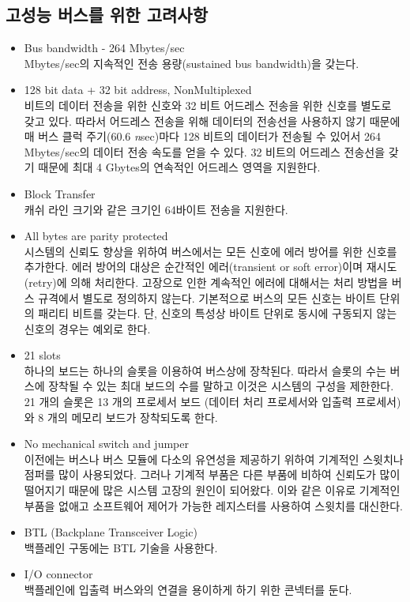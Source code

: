 \subsection{고성능 버스를 위한 고려사항}
\begin{itemize}
	\item Bus bandwidth - 264 Mbytes/sec \\
		 Mbytes/sec의 지속적인 전송 용량(sustained
		bus bandwidth)을 갖는다.
	\item 128 bit data + 32 bit address, NonMultiplexed \\
		 비트의 데이터 전송을 위한 신호와
		32 비트 어드레스 전송을 위한 신호를 
		별도로 갖고 있다. 따라서 어드레스 전송을 위해 데이터의 전송선을
		사용하지 않기 때문에
		매 버스 클럭 주기(60.6 {\it n\/}sec)마다 128 비트의 데이터가
		전송될 수 있어서 264 Mbytes/sec의 
		데이터 전송 속도를 얻을 수 있다.
		32 비트의 어드레스 전송선을 갖기 때문에
		최대 4 Gbytes의 연속적인 어드레스 영역을 지원한다.
	\item Block Transfer \\
		캐쉬 라인 크기와 같은 크기인 64바이트 전송을 지원한다.
	\item All bytes are parity protected \\
		시스템의 신뢰도 향상을 위하여 버스에서는 모든 신호에
		에러 방어를 위한 신호를 추가한다.
		에러 방어의 대상은 순간적인 에러(transient or soft error)이며
		재시도(retry)에 의해 처리한다.
		고장으로 인한 계속적인 에러에 대해서는 처리 방법을 버스 규격에서
		별도로 정의하지 않는다.
		기본적으로 버스의 모든 신호는 바이트 단위의 패리티 비트를 갖는다.
		단, 신호의 특성상 바이트 단위로 동시에 구동되지 않는
		신호의 경우는 예외로 한다.
	\item 21 slots \\
		하나의 보드는 하나의 슬롯을 이용하여 버스상에 장착된다.
		따라서 슬롯의 수는 버스에 장착될 수 있는 최대 보드의 수를 말하고
		이것은 시스템의 구성을 제한한다.
		21 개의 슬롯은 13 개의 프로세서 보드 (데이터 처리 프로세서와 입출력 프로세서)와
		8 개의 메모리 보드가 장착되도록 한다.
	\item No mechanical switch and jumper \\
		이전에는 버스나 버스 모듈에
		다소의 유연성을 제공하기 위하여 기계적인 스윗치나 점퍼를 많이 사용되었다. 
		그러나 기계적 부품은 다른 부품에 비하여 신뢰도가 많이 떨어지기
		때문에 많은 시스템 고장의 원인이 되어왔다.
		이와 같은 이유로  기계적인 부품을 없애고
		소프트웨어 제어가 가능한 레지스터를 사용하여 스윗치를 대신한다.
	\item BTL (Backplane Transceiver Logic) \\
		백플레인 구동에는 BTL 기술을 사용한다.
	\item I/O connector \\
		백플레인에 입출력 버스와의 연결을 용이하게 하기 위한 콘넥터를 둔다.
\end{itemize}
